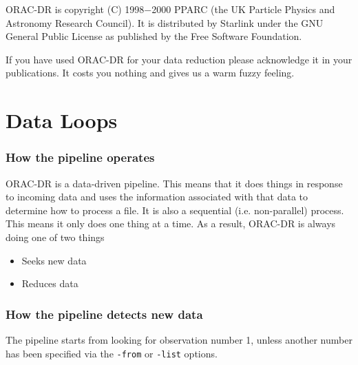 \documentclass[twoside,11pt]{article}
\newcommand{\underscore}{\leavevmode\kern.04em\vbox{\hrule width 0.4em height 0.3pt}}
\newcommand{\xlabel}[1]{}
\renewcommand{\_}{\texttt{\symbol{95}}}
\begin{document}
ORAC-DR is copyright (C) 1998$-$2000 PPARC (the UK Particle Physics and Astronomy
Research Council). It is distributed by Starlink under the
GNU General Public License as published by the Free Software Foundation.

If you have used ORAC-DR for your data reduction please acknowledge it
in your publications. It costs you nothing and gives us a warm fuzzy
feeling.

\appendix



\section{Data Loops\xlabel{data_loops}}%

\subsubsection*{How the pipeline operates}%

ORAC-DR is a data-driven pipeline. This means that it does things in
response to incoming data and uses the information associated with
that data to determine how to process a file. It is also a sequential
(i.e. non-parallel) process. This means it only does one thing at a
time. As a result, ORAC-DR is always doing one of two things

\begin{itemize}

\item
Seeks new data

\item
Reduces data

\end{itemize}

\subsubsection*{How the pipeline detects new data}%

The pipeline starts from looking for observation number 1, unless
another number has been specified via the {\tt -from} or {\tt -list} options.
\end{document}
